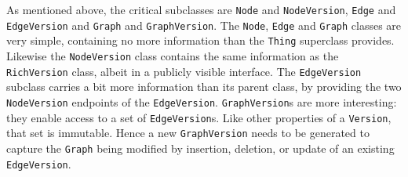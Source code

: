 \documentclass{article}
\newcommand{\core}{core\xspace}
\newcommand{\mantle}{mantle\xspace}
\newcommand{\version}{\texttt{Version}\xspace}
\newcommand{\richversion}{\texttt{RichVersion}\xspace}
\newcommand{\thing}{\texttt{Thing}\xspace}
\newcommand{\node}{\texttt{Node}\xspace}
\newcommand{\edge}{\texttt{Edge}\xspace}
\newcommand{\graph}{\texttt{Graph}\xspace}
\newcommand{\jmh}[1]{{\textcolor{red}{#1---jmh}}}
\begin{document}


As mentioned above, the critical subclasses are \node and
\texttt{NodeVersion}, \edge and \texttt{EdgeVersion} and \graph and
\texttt{GraphVersion}.  The \node, \edge and \graph classes are very simple, containing
no more information than the \thing superclass provides.  Likewise the 
\texttt{NodeVersion} class contains the same information as the \richversion class, albeit in
a publicly visible interface.
The \texttt{EdgeVersion} subclass carries a bit more information than its parent class, 
by providing the two \texttt{NodeVersion} endpoints of the \texttt{EdgeVersion}.
\texttt{GraphVersion}s are more interesting: they enable access to a set 
of \texttt{EdgeVersion}s.  Like other properties of a \version, that set is immutable.  Hence a new 
\texttt{GraphVersion} needs to be generated to capture the \graph being modified by insertion,
deletion, or update of an existing \texttt{EdgeVersion}.


\end{document}
